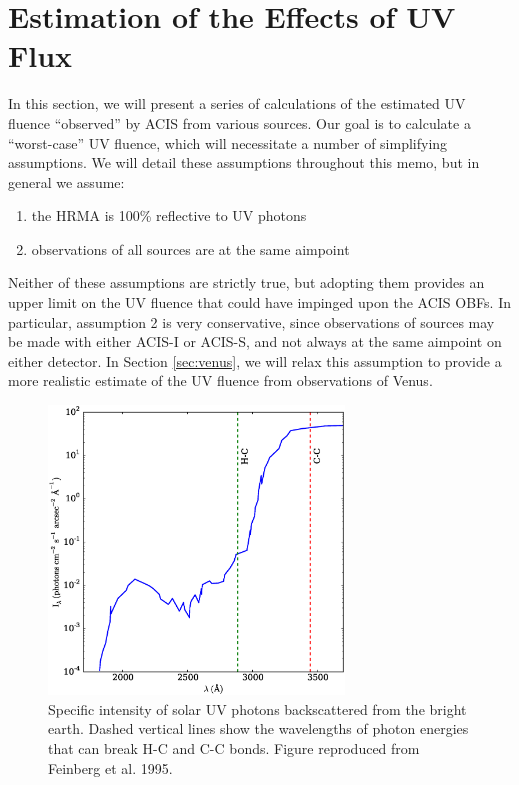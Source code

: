 \documentclass[11pt]{article}
\begin{document}
\section{Estimation of the Effects of UV Flux}

In this section, we will present a series of calculations of the estimated UV fluence
``observed'' by ACIS from various sources. Our goal is to calculate a ``worst-case'' UV
fluence, which will necessitate a number of simplifying assumptions. We will detail these
assumptions throughout this memo, but in general we assume:

\begin{enumerate}
\item the HRMA is 100\% reflective to UV photons
\item observations of all sources are at the same aimpoint
\end{enumerate}

Neither of these assumptions are strictly true, but adopting them provides an upper limit on
the UV fluence that could have impinged upon the ACIS OBFs. In particular, assumption 2 is very
conservative, since observations of sources may be made with either ACIS-I or ACIS-S, and not
always at the same aimpoint on either detector. In Section \ref{sec:venus}, we will relax this
assumption to provide a more realistic estimate of the UV fluence from observations of Venus.

\begin{figure}
\begin{center}
\includegraphics[width=0.7\textwidth]{bright_earth_intensity.eps}
\caption{Specific intensity of solar UV photons backscattered from the bright earth. Dashed
vertical lines show the wavelengths of photon energies that can break H-C and C-C bonds.
Figure reproduced from Feinberg et al. 1995.\label{fig:bright_earth_intensity}}
\end{center}
\end{figure}
\end{document}
